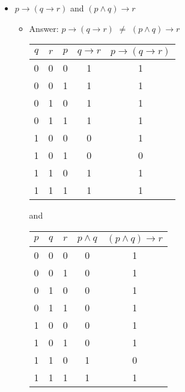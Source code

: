 \documentclass[11pt]{article}
\begin{document}
\begin{itemize}
\item $ p \to (q \to r)$ and $(p \wedge q) \to r $

 \begin{itemize}
\item Answer: $ p \to (q \to r)$ $ \ne  $ $(p \wedge q) \to r $

\vskip 0.1in

\begin{tabular}{|c|c|c|c|c|}
\hline
$q$ & $r$ & $p$ & $q \to r$ & $p \to (q \to r)$ \\
\hline
0 & 0 & 0 & 1 & 1 \\
0 & 0 & 1 & 1 & 1 \\
0 & 1 & 0 & 1 & 1 \\
0 & 1 & 1 & 1 & 1 \\
1 & 0 & 0 & 0 & 1 \\
1 & 0 & 1 & 0 & 0 \\
1 & 1 & 0 & 1 & 1 \\
1 & 1 & 1 & 1 & 1 \\
\hline
\end{tabular}

\vskip 0.1in

and 

\vskip 0.1in

\begin{tabular}{|c|c|c|c|c|}
\hline
$p$ & $q$ & $r$ & $p \land q$ & $(p \land q) \to r$ \\
\hline
0 & 0 & 0 & 0 & 1 \\
0 & 0 & 1 & 0 & 1 \\
0 & 1 & 0 & 0 & 1 \\
0 & 1 & 1 & 0 & 1 \\
1 & 0 & 0 & 0 & 1 \\
1 & 0 & 1 & 0 & 1 \\
1 & 1 & 0 & 1 & 0 \\
1 & 1 & 1 & 1 & 1 \\
\hline
\end{tabular}



\end{itemize}

 \end{itemize} 
\end{document}
